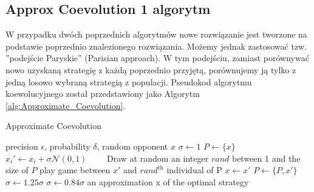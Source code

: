 \documentclass[inzynierska]{pwr_wmat_praca_dyplomowa}
\theoremstyle{plain}
\numberwithin{theorem}{chapter}
\theoremstyle{definition}
\numberwithin{theorem}{chapter}
\begin{document}
	\subsection{Approx Coevolution 1 algorytm}
	W przypadku dwóch poprzednich algorytmów nowe rozwiązanie jest tworzone na podstawie poprzednio znalezionego rozwiązania. Możemy jednak zastosować tzw. ''podejście Paryskie'' (Parisian approach)\cite{Collet_2000}. W tym podejściu, zamiast porównywać nowo uzyskaną strategię z każdą poprzednio przyjętą, porównujemy ją tylko z jedną losowo wybraną strategią z populacji. Pseudokod algorytmu koewolucyjnego został przedstawiony jako Algorytm \ref{alg:Approximate_Coevolution}. 
	\begin{algorithm}\captionsetup{labelformat=custom2}
		\caption{Approximate Coevolution}\label{alg:Approximate_Coevolution}
		\begin{algorithmic}
			\Ensure  precision $\epsilon$, probability $\delta$, random opponent $x$
			\State $\sigma \gets 1 $ 
			\State $P \gets \{ x \}$ 
			\State $x_i' \gets x_i + \sigma \mathcal{N}(0,1)$ 
			\EndFor
			\Statex \ \ \ \ Draw at random an integer $rand$ between 1 and the size of $P$
			\Repeat
			\State play game between $x'$ and $rand^\text{th}$ individual of P
			\State $x \gets x'$
			\State $P \gets \{P,x'\}$
			\State $\sigma \gets 1.25\sigma$
			\Else
			\State $\sigma \gets 0.84 \sigma$
			\EndIf
			\EndWhile
			\State \Return an approximation x of the optimal strategy
		\end{algorithmic}
	\end{algorithm}
	
\end{document}
